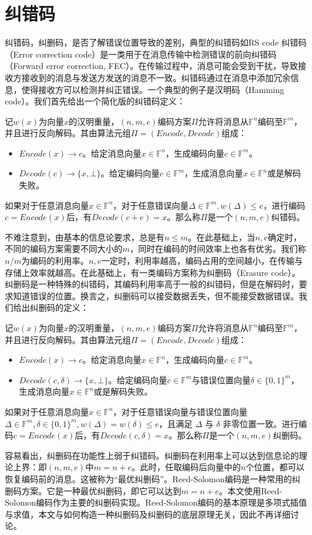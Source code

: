 \section{纠错码}
{纠错码，纠删码，是否了解错误位置导致的差别，典型的纠错码如RS code}
纠错码（Error correction code）是一类用于在消息传输中检测错误的前向纠错码（Forward error correction, FEC）。在传输过程中，消息可能会受到干扰，导致接收方接收到的消息与发送方发送的消息不一致。纠错码通过在消息中添加冗余信息，使得接收方可以检测并纠正错误。一个典型的例子是汉明码（Hamming code）。我们首先给出一个简化版的纠错码定义：

\begin{definition}[纠错码]
    记$w(x)$为向量$x$的汉明重量，$(n,m,e)$编码方案$\Pi$允许将消息从$\mathbb{F}^n$编码至$\mathbb{F}^m$，并且进行反向解码。其由算法元组$\Pi = (Encode, Decode)$组成：
    \begin{itemize}
        \item $Encode(x) \rightarrow c$。给定消息向量$x\in \mathbb{F}^n$，生成编码向量$c\in \mathbb{F}^m$。
        \item $Decode(c) \rightarrow \{x,\bot\}$。给定编码向量$c\in \mathbb{F}^m$，生成消息向量$x\in \mathbb{F}^n$或是解码失败。 
    \end{itemize}
    如果对于任意消息向量$x\in \mathbb{F}^n$，对于任意错误向量$\Delta\in \mathbb{F}^m, w(\Delta)\le e$，进行编码$c = Encode(x)$后，有$Decode(c+e) = x$。那么称$\Pi$是一个$(n,m,e)$纠错码。
\end{definition}

不难注意到，由基本的信息论要求，总是有$n\le m$。在此基础上，当$n,e$确定时，不同的编码方案需要不同大小的$m$，同时在编码的时间效率上也各有优劣。我们称$n/m$为编码的利用率。$n,e$一定时，利用率越高，编码占用的空间越小，在传输与存储上效率就越高。在此基础上，有一类编码方案称为纠删码（Erasure code）。纠删码是一种特殊的纠错码，其编码利用率高于一般的纠错码，但是在解码时，要求知道错误的位置。换言之，纠删码可以接受数据丢失，但不能接受数据错误。我们给出纠删码的定义：

\begin{definition}[纠删码]
    记$w(x)$为向量$x$的汉明重量，$(n,m,e)$编码方案$\Pi$允许将消息从$\mathbb{F}^n$编码至$\mathbb{F}^m$，并且进行反向解码。其由算法元组$\Pi = (Encode, Decode)$组成：
    \begin{itemize}
        \item $Encode(x) \rightarrow c$。给定消息向量$x\in \mathbb{F}^n$，生成编码向量$c\in \mathbb{F}^m$。
        \item $Decode(c, \delta) \rightarrow \{x,\bot\}$。给定编码向量$c\in \mathbb{F}^m$与错误位置向量$\delta\in \{0,1\}^m$，生成消息向量$x\in \mathbb{F}^n$或是解码失败。
    \end{itemize}
    如果对于任意消息向量$x\in \mathbb{F}^n$，对于任意错误向量与错误位置向量$\Delta\in \mathbb{F}^m, \delta\in \{0,1\}^m, w(\Delta)=w(\delta)\le e$，且满足 $\Delta$ 与 $\delta$ 非零位置一致。进行编码$c = Encode(x)$后，有$Decode(c, \delta) = x$。那么称$\Pi$是一个$(n,m,e)$纠删码。
\end{definition}

容易看出，纠删码在功能性上弱于纠错码。纠删码在利用率上可以达到信息论的理论上界：即$(n,m,e)$中$m=n+e$。此时，任取编码后向量中的$n$个位置，都可以恢复编码前的消息。这被称为“最优纠删码”。Reed-Solomon编码是一种常用的纠删码方案。它是一种最优纠删码，即它可以达到$m=n+e$。本文使用Reed-Solomon编码作为主要的纠删码实现。Reed-Solomon编码的基本原理是多项式插值与求值，本文与如何构造一种纠删码及纠删码的底层原理无关，因此不再详细讨论。

